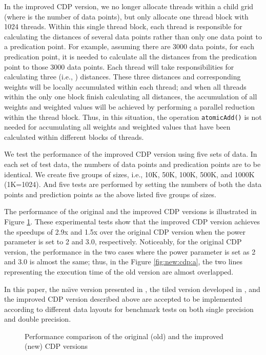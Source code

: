 In the improved CDP version, we no longer allocate  threads within a child 
grid (where  is the number of data points), but  only allocate one thread 
block with 1024 threads. Within this single thread block, each thread is 
responsible for calculating the distances of several data points rather than 
only one data point to a predication point. For example, assuming there are 
3000 data points, for each predication point, it is needed to calculate all 
the distances from the predication point to those 3000 data points. Each 
thread will take responsibilities for calculating three (i.e., ) distances. These three distances and corresponding weights will be 
locally accumulated within each thread; and when all threads within the only 
one block finish calculating all distances, the accumulation of all weights 
and weighted values will be achieved by performing a parallel reduction 
\cite{harris2007} within the thread block. Thus, in this situation, the operation 
\texttt{atomicAdd()} is not needed for accumulating all weights and weighted values 
that have been calculated within different blocks of threads. 

We test the performance of the improved CDP version using five sets of data. In each set of test data, the numbers of data points and predication points are to be identical. We create five groups of sizes, i.e., 10K, 50K, 100K, 500K, and 1000K (1K=1024). And five tests are performed by setting the numbers of both the data points and prediction points as the above listed five groups of sizes. 

The performance of the original and the improved CDP versions is illustrated in Figure \ref{fig:new:cdp}. These experimental tests show that the improved CDP version achieves the speedups of 2.9x and 1.5x over the original CDP version when the power parameter  is set to 2 and 3.0, respectively. Noticeably, for the original CDP version, the performance in the two cases where the power parameter  is set as 2 and 3.0 is almost the same; thus, in the Figure \ref{fig:new:cdp:a}, the two lines representing the execution time of the old version are almost overlapped. 


In this paper, the na\"{\i}ve version presented in \cite{huraj2010}, the tiled version 
developed in \cite{mei2014}, and the improved CDP version described above are 
accepted to be implemented according to different data layouts for benchmark 
tests on both single precision and double precision. 

\begin{figure}[htb]
    \centering
    \hspace{1em}
    \caption{Performance comparison of the original (old) and  the improved (new) CDP versions}
    \label{fig:new:cdp}       \end{figure}


